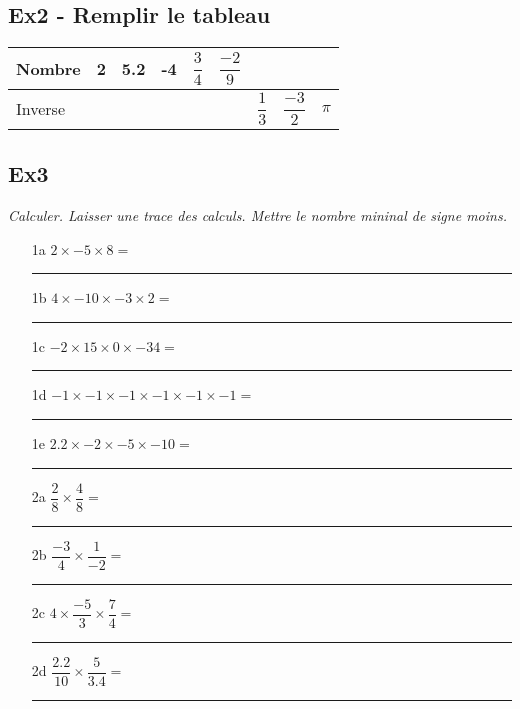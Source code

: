 \documentclass[12pt]{article}
\begin{document}

\subsection*{Ex2 - Remplir le tableau}

\begin{center}
  \begin{tabular}{| l || c | c | c | c | c | c | c | c | }
    \hline
    Nombre & 2                 & 5.2               & -4               & $\dfrac{3}{4}$   & $\dfrac{-2}{9}$  & \phantom{azerty} & \phantom{azerty} & \phantom{azerty}  \\
    \hline
    Inverse & \phantom{azerty}  & \phantom{azerty}  & \phantom{azerty} & \phantom{azerty} & \phantom{azerty} & $\dfrac{1}{3}$   & $\dfrac{-3}{2}$  & $\pi$ \\
    \hline
  \end{tabular}
\end{center}


\subsection*{Ex3}
\textit{Calculer. Laisser une trace des calculs. Mettre le nombre mininal de signe moins.}

\begin{multicols}{2}
  
\begin{enumerate}
\item[1a] $2 \times  -5 \times 8 = $\\
  \rule{\linewidth}{0.5pt}
\item[1b] $4 \times  -10 \times -3 \times 2 = $\\
  \rule{\linewidth}{0.5pt}
\item[1c] $-2 \times 15 \times 0 \times -34 = $\\
  \rule{\linewidth}{0.5pt}
\item[1d] $-1 \times -1 \times -1 \times -1 \times -1  \times -1 = $\\
  \rule{\linewidth}{0.5pt}
\item[1e] $2.2 \times -2 \times -5 \times -10 = $\\
  \rule{\linewidth}{0.5pt}   
\end{enumerate}


\begin{enumerate}
\item[2a] $ \dfrac{2}{8} \times \dfrac{4}{8} = $\\
  \rule{\linewidth}{0.5pt}
\item[2b] $ \dfrac{-3}{4} \times \dfrac{1}{-2} = $\\
  \rule{\linewidth}{0.5pt}
\item[2c] $ 4 \times \dfrac{-5}{3} \times \dfrac{7}{4} = $\\
    \rule{\linewidth}{0.5pt}
\item[2d] $ \dfrac{2.2}{10} \times \dfrac{5}{3.4} = $\\
  \rule{\linewidth}{0.5pt}
\end{enumerate}

\end{multicols}
\end{document}
